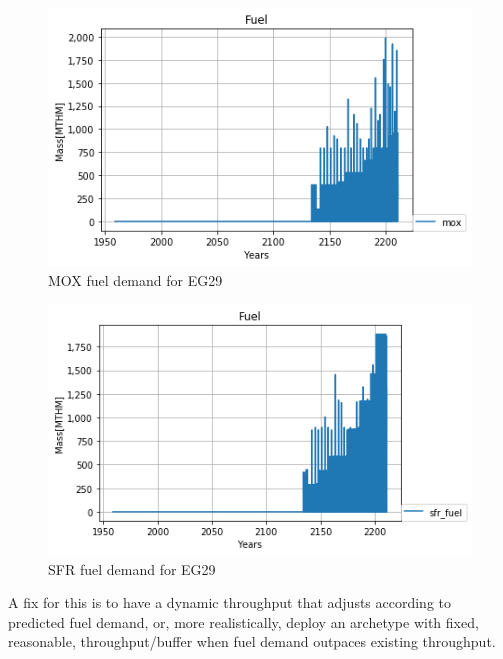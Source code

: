 \begin{figure}[htbp!]
	\begin{center}
		\includegraphics[scale=0.6]{./images/mox_fuel.png}
	\end{center}
	\caption{\gls{MOX} fuel demand for EG29}
	\label{fig:mox}
\end{figure}
\begin{figure}[htbp!]
	\begin{center}
		\includegraphics[scale=0.6]{./images/sfr_fuel.png}
	\end{center}
	\caption{\gls{SFR} fuel demand for EG29}
	\label{fig:sfr}
\end{figure}
\FloatBarrier

A fix for this is to have a dynamic throughput that adjusts according
to predicted fuel demand, or, more realistically, deploy an archetype with fixed, reasonable, throughput/buffer when fuel demand outpaces existing throughput.


